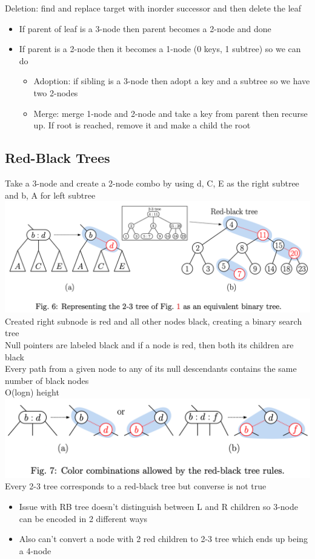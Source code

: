 \documentclass{article}
\begin{document}
  Deletion: find and replace target with inorder successor and then delete the leaf
  \begin{itemize}[noitemsep]
  \item If parent of leaf is a 3-node then parent becomes a 2-node and done
  \item If parent is a 2-node then it becomes a 1-node (0 keys, 1 subtree) so we can do
    \begin{itemize}[noitemsep]
      \item Adoption: if sibling is a 3-node then adopt a key and a subtree so we have two 2-nodes
      \item Merge: merge 1-node and 2-node and take a key from parent then recurse up. If root is reached, remove it and make a child the root
    \end{itemize}
  \end{itemize}
  \subsection{Red-Black Trees}
  Take a 3-node and create a 2-node combo by using d, C, E as the right subtree and b, A for left subtree \\
  \includegraphics[width=\textwidth]{RBTree}
  Created right subnode is red and all other nodes black, creating a binary search tree\\
  Null pointers are labeled black and if a node is red, then both its children are black \\
  Every path from a given node to any of its null descendants contains the same number of black nodes\\
  O(logn) height \\
  \includegraphics[width=\textwidth]{2-3ToRBTree}
  Every 2-3 tree corresponds to a red-black tree but converse is not true
  \begin{itemize}[noitemsep]
  \item Issue with RB tree doesn't distinguish between L and R children so 3-node can be encoded in 2 different ways
  \item Also can't convert a node with 2 red children to 2-3 tree which ends up being a 4-node
  \end{itemize}
  \newpage
\end{document}
